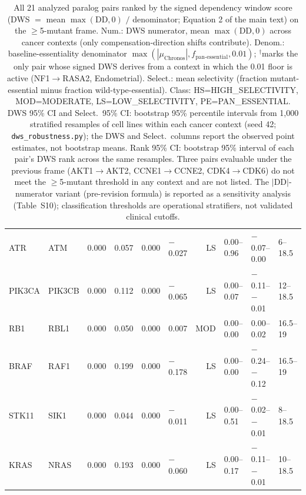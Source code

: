 \documentclass[11pt,a4paper]{article}
\begin{document}
\begin{table}[H]
\begin{tabular}{llrrrlrlll}
ATR & ATM & 0.000 & 0.057 & 0.000 & $-$0.027 & LS & 0.00--0.96 & $-$0.07--0.00 & 6--18.5 \\
PIK3CA & PIK3CB & 0.000 & 0.112 & 0.000 & $-$0.065 & LS & 0.00--0.07 & $-$0.11--$-$0.01 & 12--18.5 \\
RB1 & RBL1 & 0.000 & 0.050 & 0.000 & 0.007 & MOD & 0.00--0.00 & 0.00--0.02 & 16.5--19 \\
BRAF & RAF1 & 0.000 & 0.199 & 0.000 & $-$0.178 & LS & 0.00--0.00 & $-$0.24--$-$0.12 & 16.5--19 \\
STK11 & SIK1 & 0.000 & 0.044 & 0.000 & $-$0.011 & LS & 0.00--0.51 & $-$0.02--$-$0.01 & 8--18.5 \\
KRAS & NRAS & 0.000 & 0.193 & 0.000 & $-$0.060 & LS & 0.00--0.17 & $-$0.11--$-$0.01 & 10--18.5 \\
\bottomrule
\end{tabular}
\caption{All 21 analyzed paralog pairs ranked by the signed dependency window score (DWS $=$ mean $\max(\mathrm{DD},0)$ $/$ denominator; Equation 2 of the main text) on the $\geq$5-mutant frame. Num.: DWS numerator, mean $\max(\mathrm{DD},0)$ across cancer contexts (only compensation-direction shifts contribute). Denom.: baseline-essentiality denominator $\max(|\mu_{\text{Chronos}}|, f_{\text{pan-essential}}, 0.01)$; $^{\dagger}$marks the only pair whose signed DWS derives from a context in which the 0.01 floor is active (NF1$\rightarrow$RASA2, Endometrial). Select.: mean selectivity (fraction mutant-essential minus fraction wild-type-essential). Class: HS=HIGH\_SELECTIVITY, MOD=MODERATE, LS=LOW\_SELECTIVITY, PE=PAN\_ESSENTIAL. DWS 95\% CI and Select.\ 95\% CI: bootstrap 95\% percentile intervals from 1{,}000 stratified resamples of cell lines within each cancer context (seed 42; \texttt{dws\_robustness.py}); the DWS and Select.\ columns report the observed point estimates, not bootstrap means. Rank 95\% CI: bootstrap 95\% interval of each pair's DWS rank across the same resamples. Three pairs evaluable under the previous frame (AKT1$\rightarrow$AKT2, CCNE1$\rightarrow$CCNE2, CDK4$\rightarrow$CDK6) do not meet the $\geq$5-mutant threshold in any context and are not listed. The $|$DD$|$-numerator variant (pre-revision formula) is reported as a sensitivity analysis (Table~S10); classification thresholds are operational stratifiers, not validated clinical cutoffs.}
\end{table}
\end{document}
